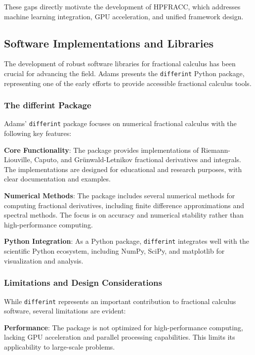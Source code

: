 These gaps directly motivate the development of HPFRACC, which addresses machine learning integration, GPU acceleration, and unified framework design.

\subsection{Software Implementations and Libraries}

The development of robust software libraries for fractional calculus has been crucial for advancing the field. Adams \cite{Adams2019DifferintPythonPackage} presents the \texttt{differint} Python package, representing one of the early efforts to provide accessible fractional calculus tools.

\subsubsection{The differint Package}

Adams' \texttt{differint} package focuses on numerical fractional calculus with the following key features:

\textbf{Core Functionality}: The package provides implementations of Riemann-Liouville, Caputo, and Grünwald-Letnikov fractional derivatives and integrals. The implementations are designed for educational and research purposes, with clear documentation and examples.

\textbf{Numerical Methods}: The package includes several numerical methods for computing fractional derivatives, including finite difference approximations and spectral methods. The focus is on accuracy and numerical stability rather than high-performance computing.

\textbf{Python Integration}: As a Python package, \texttt{differint} integrates well with the scientific Python ecosystem, including NumPy, SciPy, and matplotlib for visualization and analysis.

\subsubsection{Limitations and Design Considerations}

While \texttt{differint} represents an important contribution to fractional calculus software, several limitations are evident:

\textbf{Performance}: The package is not optimized for high-performance computing, lacking GPU acceleration and parallel processing capabilities. This limits its applicability to large-scale problems.

